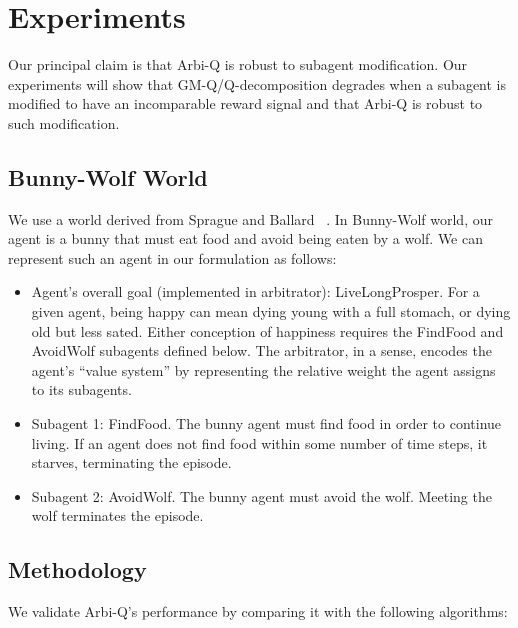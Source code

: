 \section{Experiments}

Our principal claim is that Arbi-Q is robust to subagent modification.  Our experiments will show that GM-Q/Q-decomposition degrades when a subagent is modified to have an incomparable reward signal and that Arbi-Q is robust to such modification.

\subsection{Bunny-Wolf World}

We use a world derived from Sprague and Ballard ~\cite{sprague2003multiple-goal}.  In Bunny-Wolf world, our agent is a bunny that must eat food and avoid being eaten by a wolf.  We can represent such an agent in our formulation as follows:

\begin{itemize}

\item Agent's overall goal (implemented in arbitrator):
  LiveLongProsper.  For a given agent, being happy can mean dying
  young with a full stomach, or dying old but less sated.  Either
  conception of happiness requires the FindFood and AvoidWolf
  subagents defined below.  The arbitrator, in a sense, encodes the
  agent's ``value system'' by representing the relative weight the
  agent assigns to its subagents.

\item Subagent 1: FindFood.  The bunny agent must find food in order
  to continue living.  If an agent does not find food within some
  number of time steps, it starves, terminating the episode.

\item Subagent 2: AvoidWolf.  The bunny agent must avoid the wolf.
  Meeting the wolf terminates the episode.

\end{itemize}

\subsection{Methodology}


We validate Arbi-Q's performance by comparing it with the following
algorithms:

